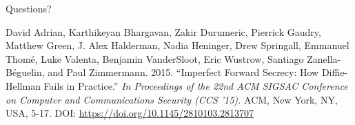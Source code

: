 \documentclass[presentation, aspectratio=54]{beamer}
\begin{document}

\begin{frame}{Questions?}

David Adrian, Karthikeyan Bhargavan, Zakir Durumeric, Pierrick Gaudry, Matthew
Green, J. Alex Halderman, Nadia Heninger, Drew Springall, Emmanuel Thomé, Luke
Valenta, Benjamin VanderSloot, Eric Wustrow, Santiago Zanella-Béguelin, and Paul
Zimmermann. 2015. ``Imperfect Forward Secrecy: How Diffie-Hellman Fails in
Practice.'' \textit{In Proceedings of the 22nd ACM SIGSAC Conference on Computer
and Communications Security (CCS '15).} ACM, New York, NY, USA, 5-17. DOI:
\url{https://doi.org/10.1145/2810103.2813707}

\end{frame}

\end{document}
